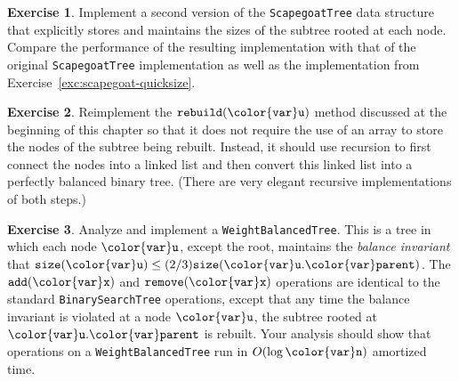 \documentclass[10pt]{book}
\theoremstyle{plain}
\theoremstyle{definition}
\newtheorem{exc}{Exercise}[chapter]
\newcommand{\exclabel}[1]{\label{exc:#1}}
\newcommand{\excref}[1]{Exercise~\ref{exc:#1}}
\begin{document}
\begin{exc}\exclabel{scapegoat-explicitsize}
  Implement a second version of the \texttt{ScapegoatTree} data structure that
  explicitly stores and maintains the sizes of the subtree rooted at
  each node.  Compare the performance of the resulting implementation
  with that of the original \texttt{ScapegoatTree} implementation as well as
  the implementation from \excref{scapegoat-quicksize}.
\end{exc}

\begin{exc}
  Reimplement the \ensuremath{\mathtt{rebuild({\color{var}u})}} method discussed at the beginning of this
  chapter so that it does not require the use of an array to store the
  nodes of the subtree being rebuilt.  Instead, it should use recursion
  to first connect the nodes into a linked list and then convert this
  linked list into a perfectly balanced binary tree.  (There are
  very elegant recursive implementations of both steps.)
\end{exc}

\begin{exc}
  Analyze and implement a \texttt{WeightBalancedTree}. This is a tree in
  which each node \ensuremath{\mathtt{{\color{var}u}}}, except the root, maintains the \emph{balance
  invariant} that $\ensuremath{\mathtt{size({\color{var}u})}} \le (2/3)\ensuremath{\mathtt{size({\color{var}u}.{\color{var}parent})}}$.  The \ensuremath{\mathtt{add({\color{var}x})}} and
  \ensuremath{\mathtt{remove({\color{var}x})}} operations are identical to the standard \texttt{BinarySearchTree}
  operations, except that any time the balance invariant is violated at
  a node \ensuremath{\mathtt{{\color{var}u}}}, the subtree rooted at \ensuremath{\mathtt{{\color{var}u}.{\color{var}parent}}} is rebuilt.
  Your analysis should show that operations on a \texttt{WeightBalancedTree}
  run in $O(\log\ensuremath{\mathtt{{\color{var}n}}})$ amortized time.  
\end{exc}
\end{document}
